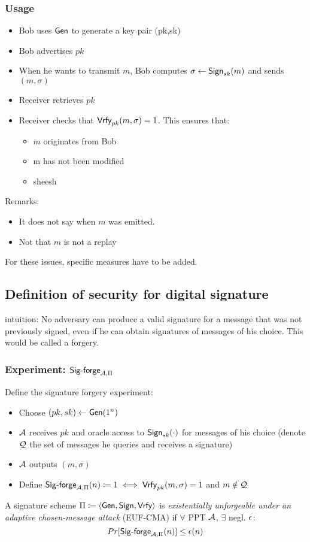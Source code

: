 \documentclass[12pt]{article}
\begin{document}
\subsubsection{Usage}
\begin{itemize}
	\item Bob uses $\operatorname{\mathsf{Gen}}$ to generate a key pair (pk,sk)
	\item Bob advertises $pk$
	\item When he wants to transmit $m$, Bob computes $\sigma \leftarrow \operatorname{\mathsf{Sign}}_{sk}(m)$ and sends $(m,\sigma)$
	\item Receiver retrieves $pk$
	\item Receiver checks that $\operatorname{\mathsf{Vrfy}}_{pk}(m,\sigma)=1$. This ensures that:
	\begin{itemize}
		\item $m$ originates from Bob
		\item m has not been modified
		\item sheesh
	\end{itemize}
\end{itemize}
Remarks:
\begin{itemize}
	\item It does not say when $m$ was emitted.
	\item Not that $m$ is not a replay
\end{itemize}
For these issues, specific measures have to be added.


\subsection{Definition of security for digital signature}
intuition: No adversary can produce a valid signature for a message that was not previously signed, even if he can obtain signatures of messages of his choice. This would be called a forgery.

\subsubsection{Experiment: $\mathsf{Sig\text{-}forge}_{\mathcal{A},\Pi}$}
Define the signature forgery experiment:
\begin{itemize}
	\item Choose $(pk,sk) \leftarrow \operatorname{\mathsf{Gen}}(1^n)$
	\item $\mathcal{A}$ receives $pk$ and oracle access to $\operatorname{\mathsf{Sign}}_{sk}(\cdot)$ for messages of his choice (denote $\mathcal{Q}$ the set of messages he queries and receives a signature)
	\item $\mathcal{A}$ outputs $(m, \sigma)$
	\item Define $\mathsf{Sig\text{-}forge}_{\mathcal{A},\Pi}(n) \coloneqq 1 \iff \operatorname{\mathsf{Vrfy}}_{pk}(m,\sigma)=1$ and $m \notin \mathcal{Q}$
\end{itemize}
A signature scheme $\Pi \coloneqq \langle \operatorname{\mathsf{Gen}}, \operatorname{\mathsf{Sign}}, \operatorname{\mathsf{Vrfy}} \rangle$ is \emph{existentially unforgeable under an adaptive chosen-message attack} (EUF-CMA) if $\forall$ PPT $\mathcal{A}$, $\exists$ negl. $\epsilon$:
\begin{equation*}
	Pr[\mathsf{Sig\text{-}forge}_{\mathcal{A},\Pi}(n)] \le \epsilon(n)
\end{equation*}
\end{document}
